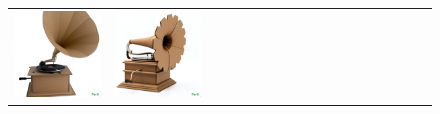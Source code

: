\begin{figure}[ht!]
\begin{adjustwidth}{-0.8in}{-0.5in}
\begin{tabular}{cccccccccccccccccccc}
\multicolumn{2}{c}{\includegraphics[width=\threebythreecolwidth\textwidth]{figures/cherries/cardboard_phonograph_0.jpg}} &
\multicolumn{2}{c}{\includegraphics[width=\threebythreecolwidth\textwidth]{figures/cherries/cardboard_phonograph_1.jpg}} &

\end{tabular}
\end{adjustwidth}
\end{figure}
